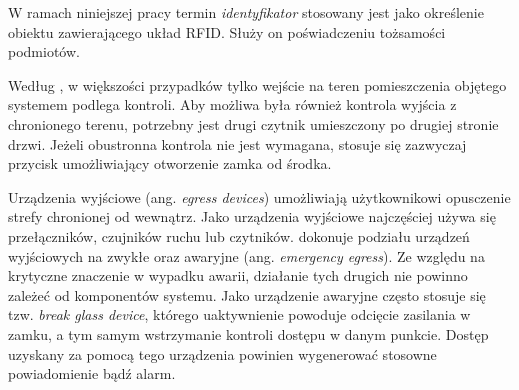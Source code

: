 		W ramach niniejszej pracy termin \textit{identyfikator} stosowany jest jako określenie obiektu zawierającego układ RFID. Służy on poświadczeniu tożsamości podmiotów.

		Według \cite{bsia2016}, w większości przypadków tylko wejście na teren pomieszczenia objętego systemem podlega kontroli. Aby możliwa była również kontrola wyjścia z chronionego terenu, potrzebny jest drugi czytnik umieszczony po drugiej stronie drzwi. Jeżeli obustronna kontrola nie jest wymagana, stosuje się zazwyczaj przycisk umożliwiający otworzenie zamka od środka.

		Urządzenia wyjściowe (ang. \textit{egress devices}) umożliwiają użytkownikowi opusczenie strefy chronionej od wewnątrz. Jako urządzenia wyjściowe najczęściej używa się przełączników, czujników ruchu lub czytników. \cite{bsia2016} dokonuje podziału urządzeń wyjściowych na zwykłe oraz awaryjne (ang. \textit{emergency egress}). Ze względu na krytyczne znaczenie w wypadku awarii, działanie tych drugich nie powinno zależeć od komponentów systemu. Jako urządzenie awaryjne często stosuje się tzw. \textit{break glass device}, którego uaktywnienie powoduje odcięcie zasilania w zamku, a tym samym wstrzymanie kontroli dostępu w danym punkcie. Dostęp uzyskany za pomocą tego urządzenia powinien wygenerować stosowne powiadomienie bądź alarm.


